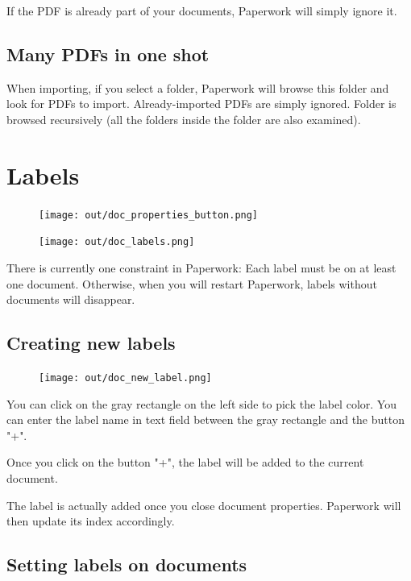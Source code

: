 \documentclass[10pt,a4paper]{article}
\begin{document}
If the PDF is already part of your documents, Paperwork will simply
ignore it.


\subsection{Many PDFs in one shot}

When importing, if you select a folder, Paperwork will browse this folder and
look for PDFs to import. Already-imported PDFs are simply ignored. Folder
is browsed recursively (all the folders inside the folder are also
examined).


\section{Labels}

\begin{figure}[H]
	\centering
	\begin{minipage}{.5\textwidth}
		\centering
		\texttt{[image: out/doc\_properties\_button.png]}
	\end{minipage}%
	\begin{minipage}{.5\textwidth}
		\centering
		\texttt{[image: out/doc\_labels.png]}
	\end{minipage}
\end{figure}

There is currently one constraint in Paperwork: Each label must be on at least
one document. Otherwise, when you will restart Paperwork, labels without
documents will disappear.


\subsection{Creating new labels}

\begin{figure}[H]
	\texttt{[image: out/doc\_new\_label.png]}
\end{figure}

You can click on the gray rectangle on the left side to pick the label color.
You can enter the label name in text field between the gray rectangle and
the button "+".

Once you click on the button "+", the label will be added to the current
document.

The label is actually added once you close document properties. Paperwork will
then update its index accordingly.


\subsection{Setting labels on documents}
\end{document}
